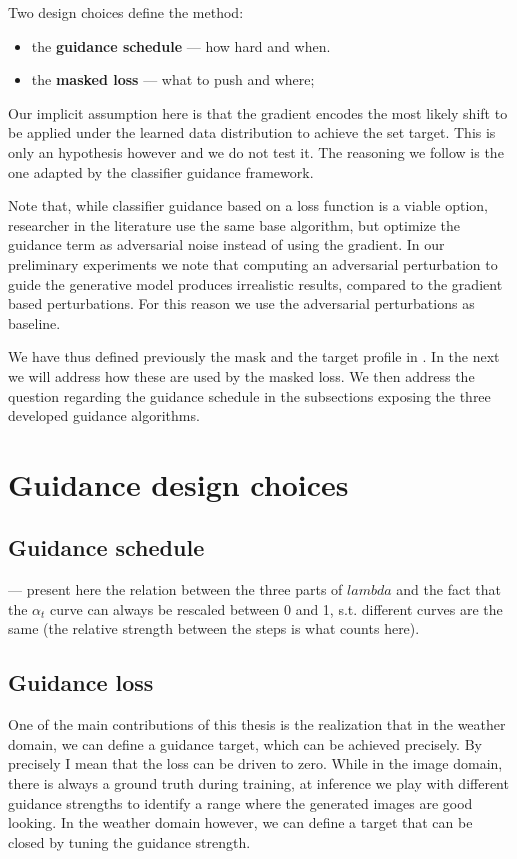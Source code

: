 Two design choices define the method:
\begin{itemize}[noitemsep]  
    \item the \textbf{guidance schedule} --- how hard and when.
    \item the \textbf{masked loss} --- what to push and where;
\end{itemize}

Our implicit assumption here is that the gradient encodes the most likely shift to be applied under the learned data distribution to achieve the set target.
This is only an hypothesis however and we do not test it. The reasoning we follow is the one adapted by the classifier guidance framework.

Note that, while classifier guidance based on a loss function is a viable option, researcher in the literature use the same base algorithm, but optimize the guidance term as adversarial noise instead of using the gradient.  
In our preliminary experiments we note that computing an adversarial perturbation to guide the generative model produces irrealistic results,
compared to the gradient based perturbations.
For this reason we use the adversarial perturbations as baseline.

We have thus defined previously the mask and the target profile in . 
In the next we will address how these are used by the masked loss.
We then address the question regarding the guidance schedule in the subsections exposing the three developed guidance algorithms.

\section{Guidance design choices}

\subsection{Guidance schedule}

--- present here the relation between the three parts of $lambda$ and the fact that the $\alpha_t$ curve can always be rescaled between 0 and 1, s.t. different curves are the same (the relative strength between the steps is what counts here). 

\subsection{Guidance loss}

One of the main contributions of this thesis is the realization that in the weather domain, we can define a guidance target, which can be achieved precisely.
By precisely I mean that the loss can be driven to zero.
While in the image domain, there is always a ground truth during training, at inference we play with different guidance strengths to identify a range where the generated images are good looking.
In the weather domain however, we can define a target that can be closed by tuning the guidance strength.

